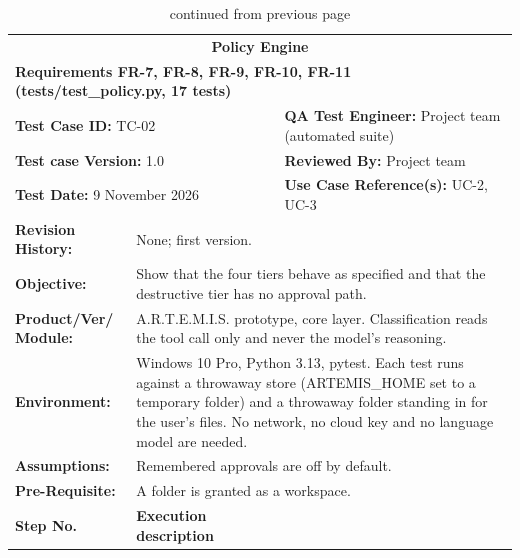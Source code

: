 \documentclass{FastFyp}
\begin{document}
{\small
{}
\begin{longtable}{|p{2.4cm}p{5.0cm}p{2.4cm}p{3.8cm}|}
\caption{Test case TC-02: policy engine classification.}\label{tab:tc2}\\*
\endfirsthead
\caption[]{continued from previous page}\\*
\endhead
\hline
\multicolumn{4}{|c|}{\textbf{Policy Engine}} \\* \hline
\multicolumn{4}{|p{14.8cm}|}{\textbf{Requirements FR-7, FR-8, FR-9, FR-10, FR-11 (tests/test\_policy.py, 17 tests)}} \\* \hline
\multicolumn{2}{|p{7.8cm}|}{\textbf{Test Case ID:} TC-02} &
  \multicolumn{2}{p{6.6cm}|}{\textbf{QA Test Engineer:} Project team (automated suite)} \\* \hline
\multicolumn{2}{|p{7.8cm}|}{\textbf{Test case Version:} 1.0} &
  \multicolumn{2}{p{6.6cm}|}{\textbf{Reviewed By:} Project team} \\* \hline
\multicolumn{2}{|p{7.8cm}|}{\textbf{Test Date:} 9 November 2026} &
  \multicolumn{2}{p{6.6cm}|}{\textbf{Use Case Reference(s):} UC-2, UC-3} \\ \hline
\multicolumn{1}{|p{2.4cm}|}{\textbf{Revision History:}} &
  \multicolumn{3}{p{12.0cm}|}{None; first version.} \\ \hline
\multicolumn{1}{|p{2.4cm}|}{\textbf{Objective:}} &
  \multicolumn{3}{p{12.0cm}|}{Show that the four tiers behave as specified and that the destructive tier has no approval path.} \\ \hline
\multicolumn{1}{|p{2.4cm}|}{\textbf{Product/Ver/ Module:}} &
  \multicolumn{3}{p{12.0cm}|}{A.R.T.E.M.I.S. prototype, core layer. Classification reads the tool call only and never the model's reasoning.} \\ \hline
\multicolumn{1}{|p{2.4cm}|}{\textbf{Environment:}} &
  \multicolumn{3}{p{12.0cm}|}{Windows 10 Pro, Python 3.13, pytest. Each test runs against a throwaway store (ARTEMIS\_HOME set to a temporary folder) and a throwaway folder standing in for the user's files. No network, no cloud key and no language model are needed.} \\ \hline
\multicolumn{1}{|p{2.4cm}|}{\textbf{Assumptions:}} &
  \multicolumn{3}{p{12.0cm}|}{Remembered approvals are off by default.} \\ \hline
\multicolumn{1}{|p{2.4cm}|}{\textbf{Pre-Requisite:}} &
  \multicolumn{3}{p{12.0cm}|}{A folder is granted as a workspace.} \\ \hline
\multicolumn{1}{|p{2.4cm}|}{\textbf{Step No.}} &
  \multicolumn{1}{p{5.0cm}|}{\textbf{Execution description}} &

\end{longtable}}
\end{document}

